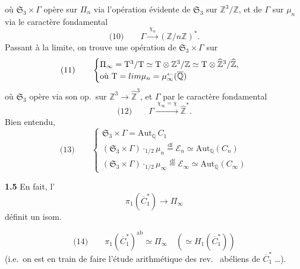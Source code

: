 \documentclass[11pt,a4paper]{article}
\begin{document}
où $\mathfrak{S}_3 \times \Gamma$ opère sur $\Pi_n$ via l'opération évidente de $\mathfrak{S}_3$ sur $\mathbb{Z}^{3}/\mathbb{Z}$, et de $\Gamma$ sur $\mu_n$ via le caractère fondamental
\[
  \text{(10)} \qquad \Gamma \xrightarrow{\ \chi_n\ } (\mathbb{Z}/n\mathbb{Z})^{*} .
\]
Passant à la limite, on trouve une opération de $\mathfrak{S}_3 \times \Gamma$ sur
\[
  \text{(11)} \qquad
  \begin{cases}
    \Pi_\infty = \mathrm{T}^{3}/\mathrm{T} \simeq \mathrm{T} \otimes \mathbb{Z}^{3}/\mathbb{Z} \simeq \mathrm{T} \otimes \widehat{\mathbb{Z}}^{3}/\widehat{\mathbb{Z}}, \\
    \text{où } \mathrm{T} = \varprojlim \mu_n = \mu^{\leftarrow}_\infty(\overline{\mathbb{Q}})
  \end{cases}
\]
où $\mathfrak{S}_3$ opère via son op.\ sur $\mathbb{Z}^{3} \to \widehat{\mathbb{Z}}^{3}$, et $\Gamma$ par le caractère fondamental
\[
  \text{(12)} \qquad \Gamma \xrightarrow{\ \chi_\infty = \chi\ } \widehat{\mathbb{Z}}^{*} .
\]
Bien entendu,
\[
  \text{(13)} \qquad
  \begin{cases}
    \mathfrak{S}_3 \times \Gamma = \mathrm{Aut}_{\mathbb{Q}}\, C_1 \\
    (\mathfrak{S}_3 \times \Gamma) \cdot_{1/2} \mu_n \overset{\mathrm{df}}{=} \mathcal{E}_n \simeq \mathrm{Aut}_{\mathbb{Q}}(C_n) \\
    (\mathfrak{S}_3 \times \Gamma) \cdot_{1/2} \mu_\infty \overset{\mathrm{df}}{=} \mathcal{E}_\infty \simeq \mathrm{Aut}_{\mathbb{Q}}(C_\infty)
  \end{cases}
\]

\textbf{1.5} En fait, l'\ \ill{}
\[
  \pi_1(\overline{C}_1^{*}) \longrightarrow \Pi_\infty
\]
définit un isom.

\[
  \text{(14)} \qquad \pi_1(\overline{C}_1^{*})^{\mathrm{ab}} \simeq \Pi_\infty \quad (\simeq H_1(\overline{C}_1^{*}))
\]
(i.e.\ on est en train de faire l'étude arithmétique des rev.\  abéliens de $\overline{C}_1^{*}$ \ldots).
\end{document}
